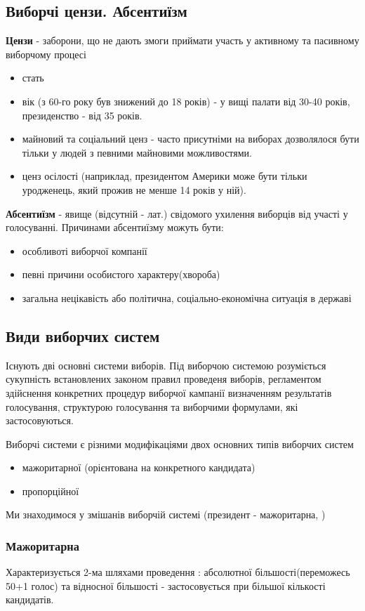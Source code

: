 \subsection{Виборчі цензи. Абсентиїзм}
\textbf{Цензи} - заборони, що не дають змоги приймати участь у активному та пасивному виборчому процесі
\begin{itemize}
	\item стать
	\item вік (з 60-го року був знижений до 18 років) - у вищі палати від 30-40 років, президенство - від 35 років.
	\item майновий та соціальний ценз - часто присутніми на виборах дозволялося бути тільки у людей з певними майновими можливостями.
	\item ценз осілості (наприклад, президентом Америки може бути тільки уродженець, який прожив не менше 14 років у ній).
\end{itemize}
\textbf{Абсентиїзм} - явище (відсутній - лат.) свідомого ухилення виборців від участі у голосуванні. Причинами абсентиїзму можуть бути:
\begin{itemize}
	\item особливоті виборчої компанії
	\item певні причини особистого характеру(хвороба)
	\item загальна нецікавість або політична, соціально-економічна ситуація в державі
\end{itemize}
\subsection{Види виборчих систем}
Існують дві основні системи виборів. Під виборчою системою розуміється сукупність встановлених законом правил проведеня виборів, регламентом здійснення конкретних процедур виборчої кампанії визначенням результатів голосування, структурою голосування та виборчими формулами, які застосовуються.

Виборчі системи є різними модифікаціями двох основних типів виборчих систем
\begin{itemize}
	\item мажоритарної (орієнтована на конкретного кандидата)
	\item пропорційної
\end{itemize}
Ми знаходимося у змішанів виборчій системі (президент - мажоритарна, )
\subsubsection{Мажоритарна}
Характеризується 2-ма шляхами проведення : абсолютної більшості(переможесь 50+1 голос) та відносної більшості - застосовується при більшої кількості кандидатів.
